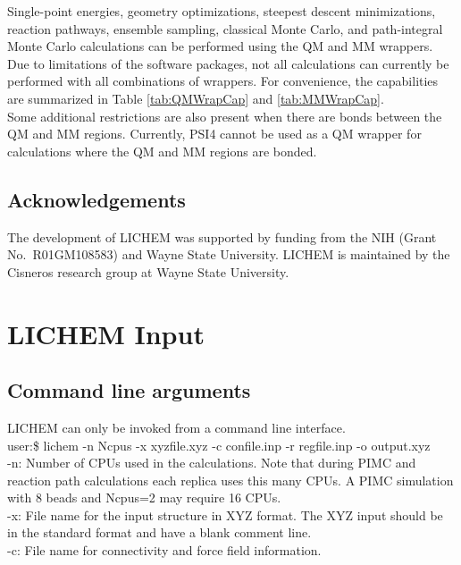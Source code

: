 \documentclass[12pt]{report}
\begin{document}
Single-point energies, geometry optimizations, steepest descent minimizations,
reaction pathways, ensemble sampling, classical Monte Carlo, and
path-integral Monte Carlo calculations can be performed using the QM and MM
wrappers.
Due to limitations of the software packages, not all calculations can
currently be performed with all combinations of wrappers.
For convenience, the capabilities are summarized in Table \ref{tab:QMWrapCap}
and \ref{tab:MMWrapCap}. \\

Some additional restrictions are also present when there are bonds between
the QM and MM regions.
Currently, PSI4 cannot be used as a QM wrapper for calculations where the QM
and MM regions are bonded.

\section{Acknowledgements}

The development of LICHEM was supported by funding from the NIH (Grant No.\
R01GM108583) and Wayne State University.
LICHEM is maintained by the Cisneros research group at Wayne State University.

\chapter{LICHEM Input}

\section{Command line arguments}

LICHEM can only be invoked from a command line interface. \\

user:\$ lichem -n Ncpus -x xyzfile.xyz -c confile.inp
-r regfile.inp -o output.xyz \\

-n: Number of CPUs used in the calculations.
Note that during PIMC and reaction path calculations each replica uses this
many CPUs.
A PIMC simulation with 8 beads and Ncpus=2 may require 16 CPUs. \\

-x: File name for the input structure in XYZ format.
The XYZ input should be in the standard format and have a blank comment
line. \\

-c: File name for connectivity and force field information. \\
\end{document}
